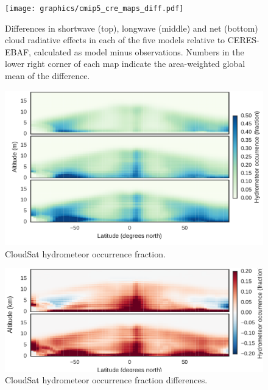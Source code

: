\begin{figure}[htbp]
\centering
\texttt{[image: graphics/cmip5\_cre\_maps\_diff.pdf]}
\caption{\label{fig:cmip5_cre_maps_diff}Differences in shortwave (top),
longwave (middle) and net (bottom) cloud radiative effects in each of
the five models relative to CERES-EBAF, calculated as model minus
observations. Numbers in the lower right corner of each map indicate the
area-weighted global mean of the
difference.}\label{fig:cmip5ux5fcreux5fmapsux5fdiff}
\end{figure}

\begin{figure}[htbp]
\centering
\includegraphics{graphics/cmip5_hfba.pdf}
\caption{\label{fig:cmip5_hfba}CloudSat hydrometeor occurrence
fraction.}\label{fig:cmip5ux5fhfba}
\end{figure}

\begin{figure}[htbp]
\centering
\includegraphics{graphics/cmip5_hfba_diff.pdf}
\caption{\label{fig:cmip5_hfba_diffs}CloudSat hydrometeor occurrence
fraction differences.}\label{fig:cmip5ux5fhfbaux5fdiffs}
\end{figure}

